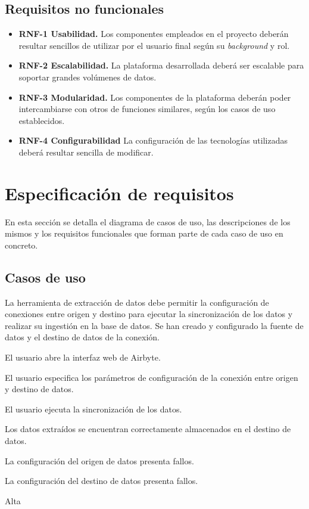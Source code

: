 \subsection{Requisitos no funcionales}

\begin{itemize}
    \item \textbf{RNF-1 Usabilidad.} Los componentes empleados en el proyecto deberán resultar sencillos de utilizar por el usuario final según su \textit{background} y rol. 

    \item \textbf{RNF-2 Escalabilidad.} La plataforma desarrollada deberá ser escalable para soportar grandes volúmenes de datos.
    
    \item \textbf{RNF-3 Modularidad.} Los componentes de la plataforma deberán poder intercambiarse con otros de funciones similares, según los casos de uso establecidos.
    
    \item \textbf{RNF-4 Configurabilidad} La configuración de las tecnologías utilizadas deberá resultar sencilla de modificar.
\end{itemize}


\section{Especificación de requisitos}

En esta sección se detalla el diagrama de casos de uso, las descripciones de los mismos y los requisitos funcionales que forman parte de cada caso de uso en concreto.



\vspace{2cm}

\subsection{Casos de uso}


{La herramienta de extracción de datos debe permitir la configuración de conexiones entre origen y destino para ejecutar la sincronización de los datos y realizar su ingestión en la base de datos.}
{Se han creado y configurado la fuente de datos y el destino de datos de la conexión.}
{
\item El usuario abre la interfaz web de Airbyte.
\item El usuario especifica los parámetros de configuración de la conexión entre origen y destino de datos.
\item El usuario ejecuta la sincronización de los datos.
}
{Los datos extraídos se encuentran correctamente almacenados en el destino de datos.}
{
\item La configuración del origen de datos presenta fallos.
\item La configuración del destino de datos presenta fallos.
}
{Alta}


